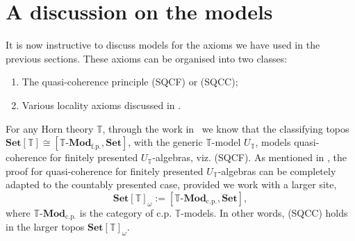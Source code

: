 \documentclass[12pt]{amsart}
\makeatletter
\newtheorem{proposition}[theorem]{Proposition}
\theoremstyle{definition}
\newtheorem{example}[theorem]{Example}
\newtheorem{remark}[theorem]{Remark}
\newcommand{\mb}[1]{\mathbf{#1}}
\newcommand{\mbb}[1]{\mathbb{#1}}
\newcommand{\T}{\mbb T}
\newcommand{\I}{\mbb I}
\newcommand{\mr}[1]{\mathrm{#1}}
\newcommand{\Set}{\mb{Set}}
\newcommand{\fp}{_{\mr{f.p.}}}
\newcommand{\cp}{_{\mr{c.p.}}}
\newcommand{\N}{\mb N}
\newcommand{\fa}[2]{\forall #1\!\colon\!\!#2.\ }
\newcommand{\ex}[2]{\exists #1\!\colon\!\!#2.\ }
\newcommand{\mmod}[1]{#1\text{-}\mathbf{Mod}}
\newcommand{\ct@}[2]{%
  \vtop{\m@th\ialign{##\cr
    \hfil$#1\operator@font lim$\hfil\cr
    \noalign{\nointerlineskip\kern1.5\ex@}#2\cr
    \noalign{\nointerlineskip\kern-\ex@}\cr}}%
}
\newcommand{\ct}{%
  \mathop{\mathpalette\ct@{\rightarrowfill@\textstyle}}\nmlimits@
}
\makeatother
\begin{document}




\section{A discussion on the models}\label{sec:model}

It is now instructive to discuss models for the axioms we have used in the previous sections. These axioms can be organised into two classes:

\begin{enumerate}
  \item The quasi-coherence principle (SQCF) or (SQCC);
  \item Various locality axioms discussed in .
\end{enumerate}

For any Horn theory $\T$, through the work in~\cite{blechschmidt2020general,blechschmidt2021using} we know that the classifying topos $\Set[\T] \cong [\mmod\T\fp,\Set]$, with the generic $\T$-model $U_\T$, models quasi-coherence for finitely presented $U_\T$-algebras, viz. (SQCF). As mentioned in , the proof for quasi-coherence for finitely presented $U_\T$-algebras can be completely adapted to the countably presented case, provided we work with a larger site,
\[ \Set[\T]_\omega := [\mmod\T\cp,\Set], \]
where $\mmod\T\cp$ is the category of c.p. $\T$-models. In other words, (SQCC) holds in the larger topos $\Set[\T]_\omega$. 
\end{document}
